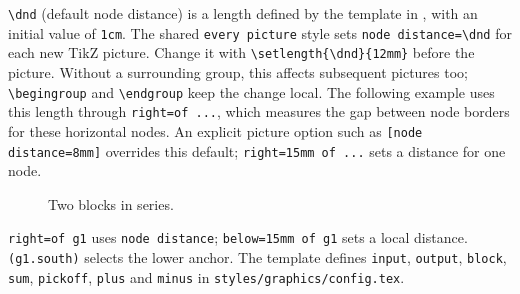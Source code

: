 \begin{referencecode}
\usepackage{uc3m-report}
\end{referencecode}
\verb|\dnd| (default node distance) is a length defined by the template
in , with an initial value
of \texttt{1cm}. The shared \texttt{every picture} style sets
\verb|node distance=\dnd| for each new TikZ picture.
Change it with \verb|\setlength{\dnd}{12mm}| before the picture.
Without a surrounding group, this affects subsequent pictures too;
\verb|\begingroup| and \verb|\endgroup| keep the change local.
The following example uses this length through \verb|right=of ...|,
which measures the gap between node borders for these horizontal nodes.
An explicit picture option such as \verb|[node distance=8mm]| overrides
this default; \verb|right=15mm of ...| sets a distance for one node.

\begin{referencecode}
\begingroup
\setlength{\dnd}{12mm}
\endgroup
\end{referencecode}

\begin{figure}[H]\centering

\begingroup
\setlength{\dnd}{12mm}
\endgroup

\caption{Two blocks in series.}\label{fig:series-blocks}
\end{figure}
\verb|right=of g1| uses \texttt{node distance};
\verb|below=15mm of g1| sets a local distance.
\verb|(g1.south)| selects the lower anchor.
The template defines \texttt{input}, \texttt{output}, \texttt{block},
\texttt{sum}, \texttt{pickoff}, \texttt{plus} and \texttt{minus} in
\texttt{styles/graphics/config.tex}.


